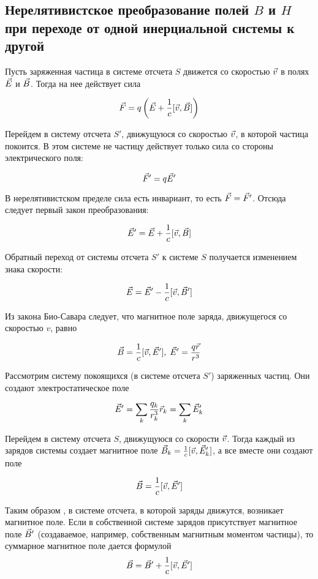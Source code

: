 \subsection{Нерелятивистское
    преобразование полей $B$ и $H$ 
при переходе от одной инерциальной
системы к другой}

Пусть заряженная частица в системе
отсчета $S$ движется со скоростью
$\vec{v}$ в полях $\vec{E}$ и $\vec{B}$.
Тогда на нее действует сила 

\[
    \vec{F} = q\left(\vec{E} +
    \frac{1}{c}[\vec{v}, \vec{B}] \right)
\]

Перейдем в систему отсчета $S'$,
движущуюся со скоростью $\vec{v}$, в
которой частица покоится. В этом системе
не частицу действует только сила со
стороны электрического поля:

\[
    \vec{F}' = q \vec{E}'
\]

В нерелятивистском пределе сила есть
инвариант, то есть $\vec{F} = \vec{F}'$.
Отсюда следует первый закон
преобразования:

\begin{equation}
    \vec{E}' = \vec{E} + \frac{1}{c}
    [\vec{v}, \vec{B}]
    \label{eq:E}
\end{equation}

Обратный переход от системы отсчета $S'$
к системе $S$ получается изменением
знака скорости:

\begin{equation}
    \vec{E} = \vec{E}' -
    \frac{1}{c}[\vec{v}, \vec{B}'] 
\end{equation}

Из закона Био-Савара следует, что
магнитное поле заряда, движущегося со
скоростью $v$, равно 

\[
    \vec{B} =
    \frac{1}{c}[\vec{v},\vec{E}'], \;
    \vec{E}' = \frac{q\vec{r}}{r^3}
\]

Рассмотрим систему покоящихся (в системе
отсчета $S'$) заряженных частиц. Они
создают электростатическое поле


\[
    \vec{E}' = \sum\limits_k
    \frac{q_k}{r_k^3} \vec{r}_k =
    \sum\limits_k \vec{E}'_k
\]

Перейдем в систему отсчета $S$,
движущуюся со скорости $\vec{v}$. Тогда
каждый из зарядов системы создает
магнитное поле $\vec{B}_k =
\frac{1}{c}[\vec{v}, \vec{E}'_k]$, а все
вместе они создают поле 

\[
    \vec{B} = \frac{1}{c} [\vec{v},
    \vec{E}']
\]

Таким образом , в системе отсчета, в
которой заряды движутся, возникает
магнитное поле. Если в собственной
системе зарядов присутствует магнитное
поле $\vec{B}'$ (создаваемое, например,
собственным магнитным моментом частицы),
то суммарное магнитное поле дается
формулой 
\begin{equation}
    \vec{B} = \vec{B}' + \frac{1}{c}
    [\vec{v}, \vec{E}']
    \label{eq:B}
\end{equation}

